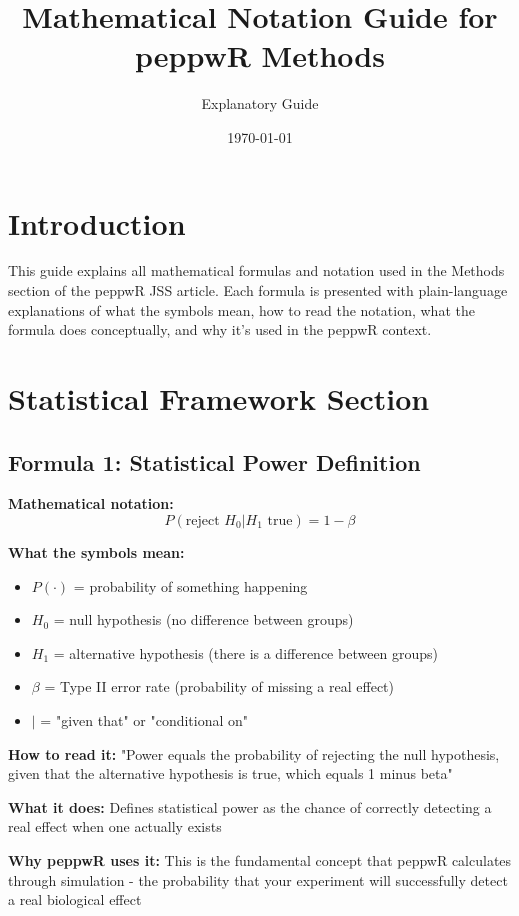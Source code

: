 \documentclass[11pt]{article}
\title{Mathematical Notation Guide for peppwR Methods}
\author{Explanatory Guide}
\date{\today}
\begin{document}
\maketitle

\section*{Introduction}

This guide explains all mathematical formulas and notation used in the Methods section of the peppwR JSS article. Each formula is presented with plain-language explanations of what the symbols mean, how to read the notation, what the formula does conceptually, and why it's used in the peppwR context.

\section{Statistical Framework Section}

\subsection{Formula 1: Statistical Power Definition}

\textbf{Mathematical notation:}
\[P(\text{reject } H_0 | H_1 \text{ true}) = 1 - \beta\]

\textbf{What the symbols mean:}
\begin{itemize}
\item $P(\cdot)$ = probability of something happening
\item $H_0$ = null hypothesis (no difference between groups)
\item $H_1$ = alternative hypothesis (there is a difference between groups)
\item $\beta$ = Type II error rate (probability of missing a real effect)
\item $|$ = "given that" or "conditional on"
\end{itemize}

\textbf{How to read it:} "Power equals the probability of rejecting the null hypothesis, given that the alternative hypothesis is true, which equals 1 minus beta"

\textbf{What it does:} Defines statistical power as the chance of correctly detecting a real effect when one actually exists

\textbf{Why peppwR uses it:} This is the fundamental concept that peppwR calculates through simulation - the probability that your experiment will successfully detect a real biological effect
\end{document}
